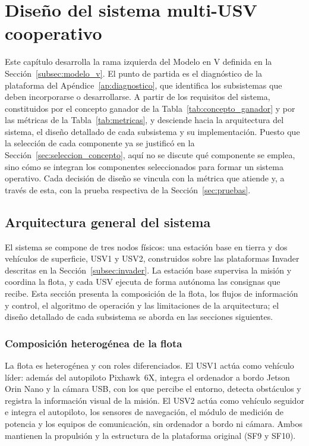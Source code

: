 \chapter{Diseño del sistema multi-USV cooperativo}
\label{cap:diseno}

Este capítulo desarrolla la rama izquierda del Modelo en V definida en la Sección~\ref{subsec:modelo_v}. El 
punto de partida es el diagnóstico de la plataforma del Apéndice~\ref{ap:diagnostico}, que identifica los 
subsistemas que deben incorporarse o desarrollarse. A partir de los requisitos del sistema, constituidos por 
el concepto ganador de la Tabla~\ref{tab:concepto_ganador} y por las 
métricas de la Tabla~\ref{tab:metricas}, y desciende hacia la arquitectura del sistema, el diseño detallado de 
cada subsistema y su implementación. Puesto que la selección de cada componente ya se justificó en la 
Sección~\ref{sec:seleccion_concepto}, aquí no se discute qué componente se emplea, sino cómo se integran los 
componentes seleccionados para formar un sistema operativo. Cada decisión de diseño se vincula con la métrica 
que atiende y, a través de esta, con la prueba respectiva de la Sección~\ref{sec:pruebas}.
 
\section{Arquitectura general del sistema}
\label{sec:arquitectura_general}
 
El sistema se compone de tres nodos físicos: una estación base en tierra y dos vehículos de superficie, USV1 y 
USV2, construidos sobre las plataformas Invader descritas en la Sección~\ref{subsec:invader}. La estación base 
supervisa la misión y coordina la flota, y cada USV ejecuta de forma autónoma las consignas que recibe. Esta 
sección presenta la composición de la flota, los flujos de información y control, el algoritmo de operación y las 
limitaciones de la arquitectura; el diseño detallado de cada subsistema se aborda en las secciones siguientes.
 
\subsection{Composición heterogénea de la flota}
\label{subsec:flota_heterogenea}
 
La flota es heterogénea y con roles diferenciados. El USV1 actúa como vehículo líder: además del autopiloto 
Pixhawk~6X, integra el ordenador a bordo Jetson Orin Nano y la cámara USB, con los que percibe el entorno, 
detecta obstáculos y registra la información visual de la misión. El USV2 actúa como vehículo seguidor e integra 
el autopiloto, los sensores de navegación, el módulo de medición de potencia y los equipos de comunicación, sin 
ordenador a bordo ni cámara. Ambos mantienen la propulsión y la estructura de la plataforma original (SF9 y SF10).
 
